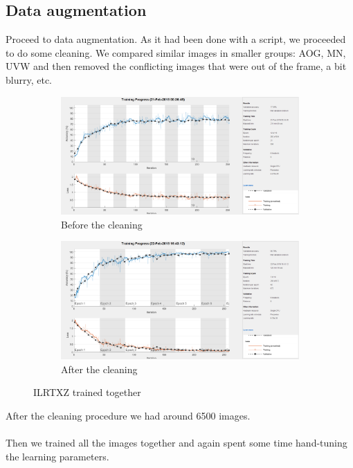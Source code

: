\documentclass[]{article}
\begin{document}
\subsection{Data augmentation}
Proceed to data augmentation. As it had been done with a script, we proceeded to do some cleaning. We compared similar images in smaller groups: AOG, MN, UVW and then removed the conflicting images that were out of the frame, a bit blurry, etc.
	\begin{figure}[h]
		\centering
		\begin{subfigure}[b]{0.49\textwidth}
			\includegraphics[width=\textwidth]{ILRTXZ_before.png}
			\caption{Before the cleaning}
		\end{subfigure}
		\begin{subfigure}[b]{0.5\textwidth}
		\includegraphics[width=\textwidth]{ILRTXZ.png}
		\caption{After the cleaning}
		\end{subfigure}
	
	\caption{ILRTXZ trained together}
	\end{figure}
\newline
After the cleaning procedure we had around 6500 images.

\paragraph*{}
Then we trained all the images together and again spent some time hand-tuning the learning parameters.
\end{document}
